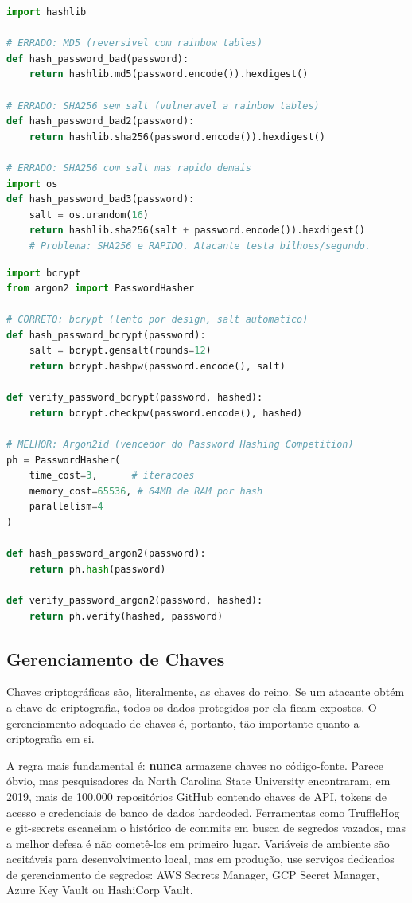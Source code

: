 \begin{lstlisting}[language=Python, caption={Hashing de senhas -- ERRADO}]
import hashlib

# ERRADO: MD5 (reversivel com rainbow tables)
def hash_password_bad(password):
    return hashlib.md5(password.encode()).hexdigest()

# ERRADO: SHA256 sem salt (vulneravel a rainbow tables)
def hash_password_bad2(password):
    return hashlib.sha256(password.encode()).hexdigest()

# ERRADO: SHA256 com salt mas rapido demais
import os
def hash_password_bad3(password):
    salt = os.urandom(16)
    return hashlib.sha256(salt + password.encode()).hexdigest()
    # Problema: SHA256 e RAPIDO. Atacante testa bilhoes/segundo.
\end{lstlisting}

\begin{lstlisting}[language=Python, caption={Hashing de senhas -- CORRETO}]
import bcrypt
from argon2 import PasswordHasher

# CORRETO: bcrypt (lento por design, salt automatico)
def hash_password_bcrypt(password):
    salt = bcrypt.gensalt(rounds=12)
    return bcrypt.hashpw(password.encode(), salt)

def verify_password_bcrypt(password, hashed):
    return bcrypt.checkpw(password.encode(), hashed)

# MELHOR: Argon2id (vencedor do Password Hashing Competition)
ph = PasswordHasher(
    time_cost=3,      # iteracoes
    memory_cost=65536, # 64MB de RAM por hash
    parallelism=4
)

def hash_password_argon2(password):
    return ph.hash(password)

def verify_password_argon2(password, hashed):
    return ph.verify(hashed, password)
\end{lstlisting}

\subsection{Gerenciamento de Chaves}

Chaves criptográficas são, literalmente, as chaves do reino. Se um atacante
obtém a chave de criptografia, todos os dados protegidos por ela ficam expostos.
O gerenciamento adequado de chaves é, portanto, tão importante quanto a
criptografia em si.

A regra mais fundamental é: \textbf{nunca} armazene chaves no código-fonte.
Parece óbvio, mas pesquisadores da North Carolina State University encontraram,
em 2019, mais de 100.000 repositórios GitHub contendo chaves de API, tokens de
acesso e credenciais de banco de dados hardcoded. Ferramentas como TruffleHog e
git-secrets escaneiam o histórico de commits em busca de segredos vazados, mas
a melhor defesa é não cometê-los em primeiro lugar. Variáveis de ambiente são
aceitáveis para desenvolvimento local, mas em produção, use serviços dedicados
de gerenciamento de segredos: AWS Secrets Manager, GCP Secret Manager, Azure
Key Vault ou HashiCorp Vault.

